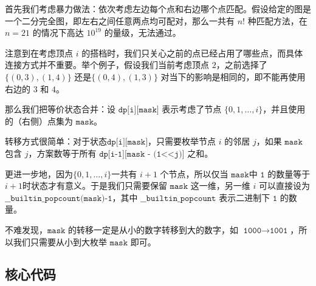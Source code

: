 首先我们考虑暴力做法：依次考虑左边每个点和右边哪个点匹配。假设给定的图是一个二分完全图，即左右之间任意两点均可配对，那么一共有 $n!$ 种匹配方法，在 $n = 21$ 的情况下高达 $10^{19}$ 的量级，无法通过。

注意到在考虑顶点 $i$ 的搭档时，我们只关心之前的点已经占用了哪些点，而具体连接方式并不重要。举个例子，假设我们当前考虑顶点 $2$，之前选择了 $\{(0,3),(1,4) \}$
还是$\{(0,4),(1,3) \}$ 对当下的影响是相同的，即不能再使用右边的 $3$ 和 $4$。

那么我们把等价状态合并：设 $\texttt{dp[i][mask]}$ 表示考虑了节点 $\{0,1,\ldots,i\}$，并且使用的（右侧）点集为 $\texttt{mask}$。

转移方式很简单：对于状态$\texttt{dp[i][mask]}$，只需要枚举节点 $i$ 的邻居 $j$，如果 $\texttt{mask}$ 包含 $j$，方案数等于所有 $\texttt{dp[i-1][mask - (1<<j)]}$ 之和。

更进一步地，因为$\{0,1,\ldots,i\}$一共有 $i+1$ 个节点，所以仅当 $\texttt{mask}$中 $\texttt{1}$ 的数量等于$i + 1$时状态才有意义。于是我们只需要保留 $\texttt{mask}$ 这一维，另一维 $i$ 可以直接设为 $\texttt{\_\_builtin\_popcount(mask)-1} $，其中 $\texttt{\_\_builtin\_popcount}$ 表示二进制下 $\texttt{1}$ 的数量。

不难发现，$\texttt{mask}$ 的转移一定是从小的数字转移到大的数字，如 $\texttt{1000} \rightarrow \texttt{1001}$，所以我们只需要从小到大枚举 $\texttt{mask}$ 即可。






\subsection*{核心代码}
\inputminted[linenos,autogobble]{cpp}{../Code/O.cpp}
\newpage